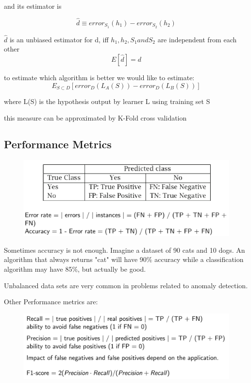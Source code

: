 and its estimator is

\begin{equation}
    \hat{d} \equiv error_{S_1} (h_1) - error_{S_2} (h_2)
\end{equation}

$\hat{d}$ is an unbiased estimator for d, iff $h_1, h_2, S_1 and S_2$ are independent from each other
\begin{equation}
    E[\hat{d}] = d
\end{equation}

to estimate which algorithm is better we would like to estimate:
\begin{equation}
    E_{S\subset D}[error_D (L_A(S)) - error_D(L_B(S))]
\end{equation}

where L(S) is the hypothesis output by learner L using training set S

this measure can be approximated by K-Fold cross validation

\subsection{Performance Metrics}

\begin{figure}[H]
    \centering
    \includegraphics[width=12cm,keepaspectratio]{images/Classification Evaluation/Screenshot_20221004_131728.png}
    \caption{}
    \label{fig:image2}
\end{figure}

Sometimes accuracy is not enough. Imagine a dataset of 90 cats and 10 dogs. An algorithm that always returns "cat" will have 90$\%$ accuracy while a classification algorithm may have 85$\%$, but actually be good.

Unbalanced data sets are very common in problems related to anomaly detection.

Other Performance metrics are:

\begin{figure}[H]
    \centering
    \includegraphics[width=12cm,keepaspectratio]{images/Classification Evaluation/Screenshot_20221004_134809.png}
    \caption{}
    \label{fig:image_metric_1}
\end{figure}

